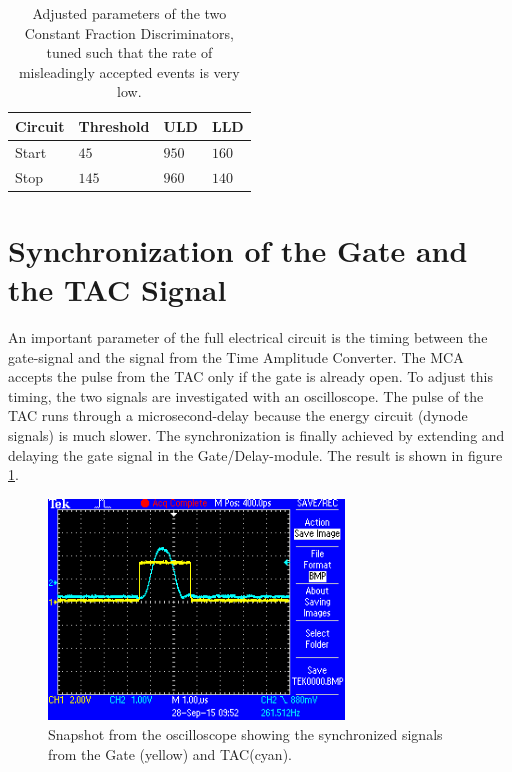 \documentclass[
	paper=A4,
	parskip=full,
	chapterprefix=true,
	11pt,
	headings=normal,
	bibliography=totoc,
	listof=totoc,
	titlepage=on,
]{scrreprt}
\begin{document}
\begin{table}[htbp]
	\centering
	\begin{tabular}{ 
			l
			l
			l
			l
		}
		\toprule
		{Circuit} & {Threshold} & {ULD} & {LLD} \\ 
		\midrule
		Start & $45$ & $950$ & $160$ \\
		Stop & $145$ & $960$ & $140$ \\
		\bottomrule
	\end{tabular}
	\caption{Adjusted parameters of the two Constant Fraction Discriminators, tuned such that the rate of misleadingly accepted events is very low.}
	\label{tbl:CFD_values}
\end{table}

\section{Synchronization of the Gate and the TAC Signal}
An important parameter of the full electrical circuit is the timing between the gate-signal and the signal from the Time Amplitude Converter. The MCA accepts the pulse from the TAC only if the gate is already open. To adjust this timing, the two signals are investigated with an oscilloscope. The pulse of the TAC runs through a microsecond-delay because the energy circuit (dynode signals) is much slower. The synchronization is finally achieved by extending and delaying the gate signal in the Gate/Delay-module. The result is shown in figure \ref{fig:GateDynode_sync}.

\begin{figure}[h]
	\centering
	\includegraphics[width=0.7\textwidth]{../images/gate_vs_dynode/F0002TEK.png}
	\caption{Snapshot from the oscilloscope showing the synchronized signals from the Gate (yellow) and TAC(cyan).}
	\label{fig:GateDynode_sync}
\end{figure}
\end{document}
